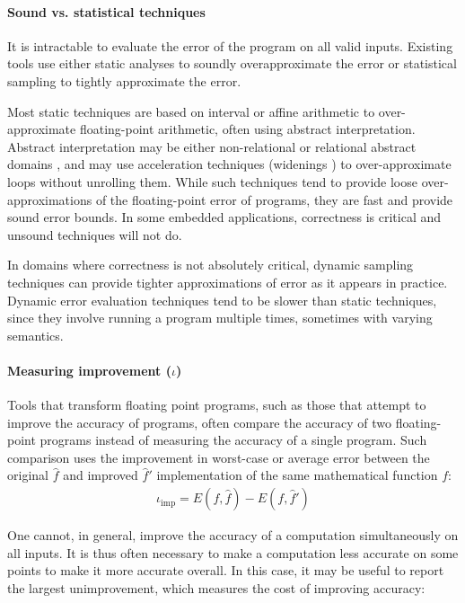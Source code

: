 \documentclass[main.tex]{subfiles}
\begin{document}
\paragraph{Sound vs. statistical techniques}

It is intractable to evaluate the error of the program on all valid inputs.
Existing tools use
  either static analyses to soundly overapproximate the error
  or statistical sampling to tightly approximate the error.

Most static techniques are based on interval or affine arithmetic
  to over-approximate floating-point arithmetic,
  often using abstract interpretation.
Abstract interpretation may be either non-relational \cite{Mar05}
  or relational abstract domains \cite{Cha10,GP11,AGW15},
  and may use acceleration techniques (widenings \cite{CC92})
  to over-approximate loops without unrolling them.
While such techniques tend to provide loose over-approximations
of the floating-point error of programs, they are fast and
provide sound error bounds. In some embedded applications,
correctness is critical and unsound techniques will not do.

In domains where correctness is not absolutely critical,
dynamic sampling techniques can provide tighter approximations of
error as it appears in practice. Dynamic error evaluation techniques
tend to be slower than static techniques, since they involve running a
program multiple times, sometimes with varying semantics.

\paragraph{Measuring improvement ($\iota$)}

Tools that transform floating point programs,
  such as those that attempt to improve the accuracy of programs,
  often compare the accuracy of two floating-point programs
  instead of measuring the accuracy of a single program.
Such comparison uses the improvement in worst-case or average error
  between the original $\hat f$ and improved $\hat f'$ implementation
  of the same mathematical function $f$:
\begin{align*}
  \iota_{\text{imp}} = E(f, \hat{f}) - E(f, \hat{f}')
\end{align*}

One cannot, in general,
  improve the accuracy of a computation
  simultaneously on all inputs.
It is thus often necessary
  to make a computation less accurate on some points
  to make it more accurate overall.
In this case, it may be useful to report the largest unimprovement,
  which measures the cost of improving accuracy:
\end{document}
